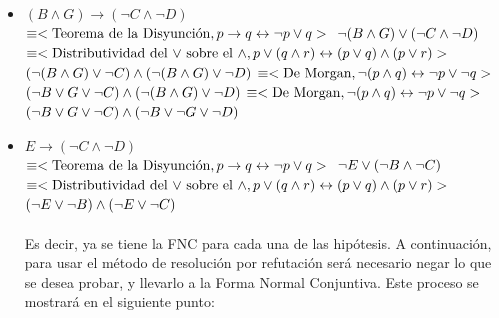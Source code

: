 \documentclass{article}
\begin{document}
\begin{itemize}
\begin{itemize}
\begin{itemize}
		\item $ (B \land G) \rightarrow (\neg C \land \neg D)$ \\
				$\equiv < \text{Teorema de la Disyunci\'on},  
					p \rightarrow q \leftrightarrow \neg p \lor q > \\$
				$ \neg (B \land G) \lor (\neg C \land \neg D)\\$
				$\equiv <\text{Distributividad del $\lor$ sobre el $\land$}, 	
					p \lor (q \land r) \leftrightarrow (p \lor q) \land (p \lor r)>\\$
				$ (\neg(B \land G) \lor \neg C) \land (\neg(B \land G) \lor \neg D) \\$
				$\equiv <\text{De Morgan}, 
					\neg(p \land q) \leftrightarrow \neg p \lor \neg q> \\$
				$ (\neg B \lor G \lor \neg C) \land (\neg(B \land G) \lor \neg D) \\$							$\equiv <\text{De Morgan}, 
					\neg(p \land q) \leftrightarrow \neg p \lor \neg q> \\$
				$ (\neg B \lor G \lor \neg C) \land (\neg B \lor \neg G \lor \neg D) \\$
		
		\item $ E \rightarrow (\neg C \land \neg D)$ \\ 
				$\equiv < \text{Teorema de la Disyunci\'on},  
					p \rightarrow q \leftrightarrow \neg p \lor q > \\$
				$ \neg E \lor (\neg B \land \neg C)\\$
				$\equiv <\text{Distributividad del $\lor$ sobre el $\land$}, 	
					p \lor (q \land r) \leftrightarrow (p \lor q) \land (p \lor r)>\\$
				$ (\neg E \lor \neg B) \land (\neg E \lor \neg C)\\$
				
		\paragraph{}		
		Es decir, ya se tiene la FNC para cada una de las hip\'otesis. A continuaci\'on, para usar el m\'etodo de resoluci\'on por refutaci\'on ser\'a necesario negar lo que se desea probar, y llevarlo a la Forma Normal Conjuntiva. Este proceso se mostrar\'a en el siguiente punto: \\
		

\end{itemize}
\end{itemize}
\end{itemize}
\end{document}
